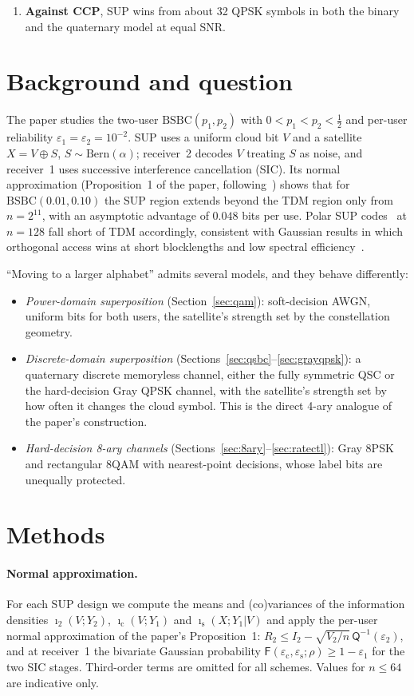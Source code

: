 \documentclass[11pt]{article}
\newcommand{\Qinv}{\mathsf{Q}^{-1}}
\begin{document}
\begin{enumerate}
\item \textbf{Against CCP}, SUP wins from about 32 QPSK symbols in both the binary and the quaternary model at equal SNR.
\end{enumerate}

\section{Background and question}
The paper studies the two-user $\mathrm{BSBC}(p_1,p_2)$ with $0<p_1<p_2<\frac12$ and per-user reliability $\varepsilon_1=\varepsilon_2=10^{-2}$. SUP uses a uniform cloud bit $V$ and a satellite $X=V\oplus S$, $S\sim\mathrm{Bern}(\alpha)$; receiver~2 decodes $V$ treating $S$ as noise, and receiver~1 uses successive interference cancellation (SIC). Its normal approximation (Proposition~1 of the paper, following~\cite{Tan+Kosut,polyanskiy:TIT2010}) shows that for $\mathrm{BSBC}(0.01,0.10)$ the SUP region extends beyond the TDM region only from $n=2^{11}$, with an asymptotic advantage of $0.048$ bits per use. Polar SUP codes~\cite{6975233} at $n=128$ fall short of TDM accordingly, consistent with Gaussian results in which orthogonal access wins at short blocklengths and low spectral efficiency~\cite{gorce2021noma}.

``Moving to a larger alphabet'' admits several models, and they behave differently:
\begin{itemize}
\item \emph{Power-domain superposition} (Section~\ref{sec:qam}): soft-decision AWGN, uniform bits for both users, the satellite's strength set by the constellation geometry.
\item \emph{Discrete-domain superposition} (Sections~\ref{sec:qsbc}--\ref{sec:grayqpsk}): a quaternary discrete memoryless channel, either the fully symmetric QSC or the hard-decision Gray QPSK channel, with the satellite's strength set by how often it changes the cloud symbol. This is the direct 4-ary analogue of the paper's construction.
\item \emph{Hard-decision 8-ary channels} (Sections~\ref{sec:8ary}--\ref{sec:ratectl}): Gray 8PSK and rectangular 8QAM with nearest-point decisions, whose label bits are unequally protected.
\end{itemize}

\section{Methods}
\paragraph{Normal approximation.} For each SUP design we compute the means and (co)variances of the information densities $\imath_2(V;Y_2)$, $\imath_{\mathrm c}(V;Y_1)$ and $\imath_{\mathrm s}(X;Y_1|V)$ and apply the per-user normal approximation of the paper's Proposition~1: $R_2\le I_2-\sqrt{V_2/n}\,\Qinv(\varepsilon_2)$, and at receiver~1 the bivariate Gaussian probability $\mathsf F(\varepsilon_{\mathrm c},\varepsilon_{\mathrm s};\rho)\ge1-\varepsilon_1$ for the two SIC stages. Third-order terms are omitted for all schemes. Values for $n\le64$ are indicative only.
\end{document}
